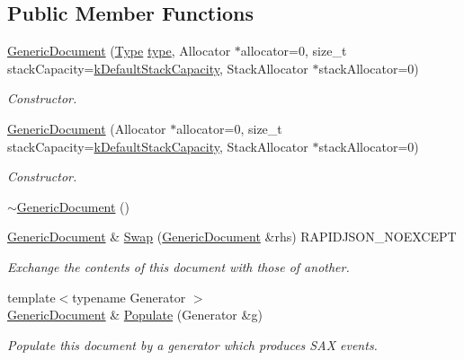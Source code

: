 \subsection*{Public Member Functions}
\begin{DoxyCompactItemize}
\item 
\hyperlink{classGenericDocument_a3da21e72ec8f26b9da77d86cc1d41cdd}{Generic\+Document} (\hyperlink{rapidjson_8h_a1d1cfd8ffb84e947f82999c682b666a7}{Type} \hyperlink{imgui__impl__opengl3__loader_8h_a63267399cd2a2ee217572c11d2e54f07}{type}, Allocator $\ast$allocator=0, size\+\_\+t stack\+Capacity=\hyperlink{classGenericDocument_a90d452abe8940d8a9c9634d1c49d8f49}{k\+Default\+Stack\+Capacity}, Stack\+Allocator $\ast$stack\+Allocator=0)
\begin{DoxyCompactList}\small\item\em Constructor. \end{DoxyCompactList}\item 
\hyperlink{classGenericDocument_a6b1c313ad538cafc4d23d4bd5f97178c}{Generic\+Document} (Allocator $\ast$allocator=0, size\+\_\+t stack\+Capacity=\hyperlink{classGenericDocument_a90d452abe8940d8a9c9634d1c49d8f49}{k\+Default\+Stack\+Capacity}, Stack\+Allocator $\ast$stack\+Allocator=0)
\begin{DoxyCompactList}\small\item\em Constructor. \end{DoxyCompactList}\item 
\hyperlink{classGenericDocument_aa9f980909298a4de32f66526484820bf}{$\sim$\+Generic\+Document} ()
\item 
\hyperlink{classGenericDocument}{Generic\+Document} \& \hyperlink{classGenericDocument_a6290e1290fad74177625af5938c0c58f}{Swap} (\hyperlink{classGenericDocument}{Generic\+Document} \&rhs) R\+A\+P\+I\+D\+J\+S\+O\+N\+\_\+\+N\+O\+E\+X\+C\+E\+PT
\begin{DoxyCompactList}\small\item\em Exchange the contents of this document with those of another. \end{DoxyCompactList}\item 
{\footnotesize template$<$typename Generator $>$ }\\\hyperlink{classGenericDocument}{Generic\+Document} \& \hyperlink{classGenericDocument_a36fbc7d0a9595d26e0d2c8859d207d1f}{Populate} (Generator \&g)
\begin{DoxyCompactList}\small\item\em Populate this document by a generator which produces S\+AX events. \end{DoxyCompactList}\item 

\end{DoxyCompactItemize}
